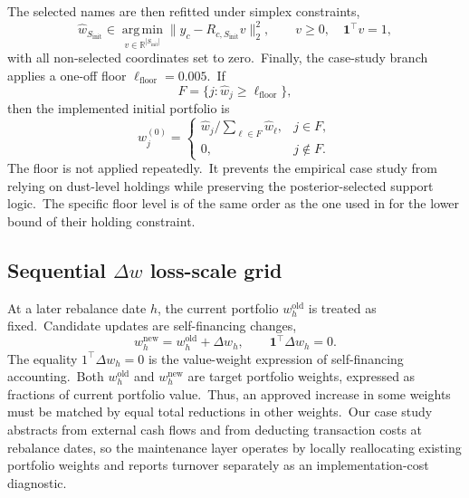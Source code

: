 \documentclass[11pt]{article}
\newcommand{\argmin}{\operatorname*{arg\,min}}
\newcommand{\one}{\mathbf{1}}
\begin{document}
The selected names are then refitted under simplex constraints,
\begin{equation}
  \widehat w_{S_{\mathrm{init}}}
  \in
  \argmin_{v\in\mathbb R^{|S_{\mathrm{init}}|}}
  \|y_c-R_{c,S_{\mathrm{init}}}v\|_2^2,
  \qquad
  v\geq0,
  \quad
  \one^\top v=1,
  \label{eq:workflow-support-refit}
\end{equation}
with all non-selected coordinates set to zero.\  Finally, the case-study branch applies a one-off floor \(\ell_{\mathrm{floor}}=0.005\).\ If
\begin{equation}
  F=\{j:\widehat w_j\geq \ell_{\mathrm{floor}}\},
\end{equation}
then the implemented initial portfolio is
\begin{equation}
  w^{(0)}_j
  =
  \begin{cases}
  \widehat w_j\Big/\sum_{\ell\in F}\widehat w_\ell, & j\in F,\\[4pt]
  0, & j\notin F.
  \end{cases}
  \label{eq:workflow-floor-map}
\end{equation}
The floor is not applied repeatedly.\ It prevents the empirical case study from relying on dust-level holdings while preserving the posterior-selected support logic.\ The specific floor level is of the same order as the one used in \citet{Benidis2018b} for the lower bound of their holding constraint.

\subsection{Sequential \(\Delta w\) loss-scale grid}\label{subsec:workflow-dw-grid}

At a later rebalance date \(h\), the current portfolio \(w_h^{\mathrm{old}}\) is treated as fixed.\ Candidate updates are self-financing changes,
\begin{equation}
  w_h^{\mathrm{new}}=w_h^{\mathrm{old}}+\Delta w_h,
  \qquad
  \one^\top\Delta w_h=0.
  \label{eq:workflow-dw-self-financing}
\end{equation}
The equality \(1^\top \Delta w_h=0\) is the value-weight expression of self-financing accounting.\ Both \(w_h^{\mathrm{old}}\) and \(w_h^{\mathrm{new}}\) are target portfolio weights, expressed as fractions of current portfolio value.\ Thus, an approved increase in some weights must be matched by equal total reductions in other weights.\ Our case study abstracts from external cash flows and from deducting transaction costs at rebalance dates, so the maintenance layer operates by locally reallocating existing portfolio weights and reports turnover separately as an implementation-cost diagnostic.\
\end{document}
